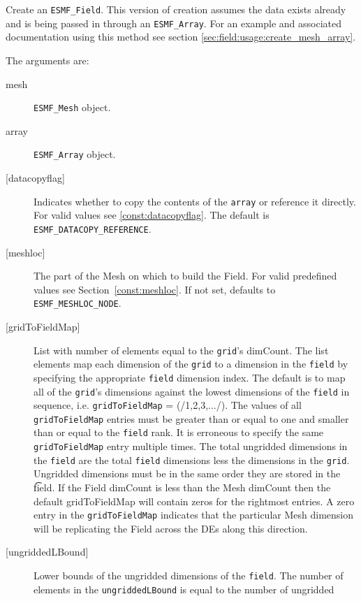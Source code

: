    Create an {\tt ESMF\_Field}. This version of creation
   assumes the data exists already and is being
   passed in through an {\tt ESMF\_Array}. For an example and
   associated documentation using this method see section
   \ref{sec:field:usage:create_mesh_array}.
  
   The arguments are:
   \begin{description}
   \item [mesh]
   {\tt ESMF\_Mesh} object.
   \item [array]
   {\tt ESMF\_Array} object.
   \item [{[datacopyflag]}]
   Indicates whether to copy the contents of the {\tt array} or reference it directly.
   For valid values see \ref{const:datacopyflag}. The default is
   {\tt ESMF\_DATACOPY\_REFERENCE}.
   \item [{[meshloc]}]
   \begin{sloppypar}
   The part of the Mesh on which to build the Field. For valid
   predefined values see Section~\ref{const:meshloc}.
   If not set, defaults to {\tt ESMF\_MESHLOC\_NODE}.
   \end{sloppypar}
   \item [{[gridToFieldMap]}]
   List with number of elements equal to the
   {\tt grid}'s dimCount. The list elements map each dimension
   of the {\tt grid} to a dimension in the {\tt field} by
   specifying the appropriate {\tt field} dimension index. The default is to
   map all of the {\tt grid}'s dimensions against the lowest dimensions of
   the {\tt field} in sequence, i.e. {\tt gridToFieldMap} = (/1,2,3,.../).
   The values of all {\tt gridToFieldMap} entries must be greater than or equal
   to one and smaller than or equal to the {\tt field} rank.
   It is erroneous to specify the same {\tt gridToFieldMap} entry
   multiple times. The total ungridded dimensions in the {\tt field}
   are the total {\tt field} dimensions less
   the dimensions in
   the {\tt grid}. Ungridded dimensions must be in the same order they are
   stored in the {\t field}.
   If the Field dimCount is less than the Mesh dimCount then the default
   gridToFieldMap will contain zeros for the rightmost entries. A zero
   entry in the {\tt gridToFieldMap} indicates that the particular
   Mesh dimension will be replicating the Field across the DEs along
   this direction.
   \item [{[ungriddedLBound]}]
   Lower bounds of the ungridded dimensions of the {\tt field}.
   The number of elements in the {\tt ungriddedLBound} is equal to the number of ungridded

\end{description}
